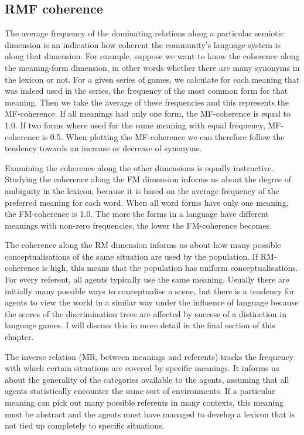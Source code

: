 \subsection{RMF coherence}

The average frequency of the dominating relations along
a particular semiotic dimension is an indication how coherent the
community's language system is along that dimension.
For example, suppose we want to know the coherence along
the meaning-form dimension, in other words
whether there are many synonyms in the lexicon or not.
For a given series of games, we calculate for each meaning
that was indeed used in the series,
the frequency of the most common form
for that meaning. Then we take the average of these frequencies
and this represents the MF-coherence. If all meanings had
only one form, the MF-coherence is equal to 1.0. If two forms
where used for the same meaning with equal frequency, 
MF-coherence is 0.5. When plotting the
MF-coherence we can therefore follow the tendency towards
an increase or decrease of synonyms.

Examining the coherence along the other dimensions is 
equally instructive. Studying the coherence along the FM 
dimension informs us about the degree of ambiguity in the lexicon, 
because it is based on the average frequency of
the preferred meaning for each word. 
When all word forms have only one meaning, the FM-coherence is 
1.0. The more the forms in a language have different 
meanings with non-zero frequencies, the lower the FM-coherence
becomes. 

The coherence along the RM dimension informs us 
about how many possible conceptualisations of the same
situation are used by the population. If RM-coherence is 
high, this means that the population has 
uniform conceptualisations. For every referent, 
all agents typically use the same meaning. 
Usually there are initially many possible ways to conceptualise 
a scene, but there is a tendency 
for agents to view the world in a similar way under
the influence of language because the scores of the 
discrimination trees are affected by success of a 
distinction in language games. I will discuss this 
in more detail in the final section of this chapter.

The inverse relation (MR, between meanings and referents)
tracks the frequency with 
which certain situations are covered by specific
meanings. It informs us about 
the generality of the categories available to the 
agents, assuming that all agents statistically encounter
the same sort of environments. If a particular meaning can
pick out many possible referents in many contexts, this
meaning must be abstract and the agents must have managed
to develop a lexicon that is not tied up completely 
to specific situations. 

